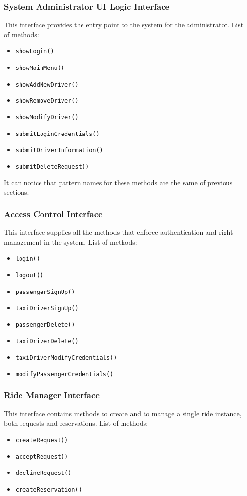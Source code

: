\subsubsection{System Administrator UI Logic Interface}
This interface provides the entry point to the system for the administrator. \newline
List of methods:
\begin{itemize}
	\item \texttt{showLogin()}
	\item \texttt{showMainMenu()}
	\item \texttt{showAddNewDriver()}
	\item \texttt{showRemoveDriver()}
	\item \texttt{showModifyDriver()}
	\item \texttt{submitLoginCredentials()}
	\item \texttt{submitDriverInformation()}
	\item \texttt{submitDeleteRequest()}
\end{itemize}
It can notice that pattern names for these methods are the same of previous sections.
\subsubsection{Access Control Interface}
This interface supplies all the methods that enforce authentication and right management in the system. \newline
List of methods:
\begin{itemize}
	\item \texttt{login()}
	\item \texttt{logout()}
	\item \texttt{passengerSignUp()}
	\item \texttt{taxiDriverSignUp()}
	\item \texttt{passengerDelete()}
	\item \texttt{taxiDriverDelete()}
	\item \texttt{taxiDriverModifyCredentials()}
	\item \texttt{modifyPassengerCredentials()}
\end{itemize}
\subsubsection{Ride Manager Interface}
This interface contains methods to create and to manage a single ride instance, both requests and reservations. \newline
List of methods:
\begin{itemize}
	\item \texttt{createRequest()}
	\item \texttt{acceptRequest()}
	\item \texttt{declineRequest()}
	\item \texttt{createReservation()}
\end{itemize}
